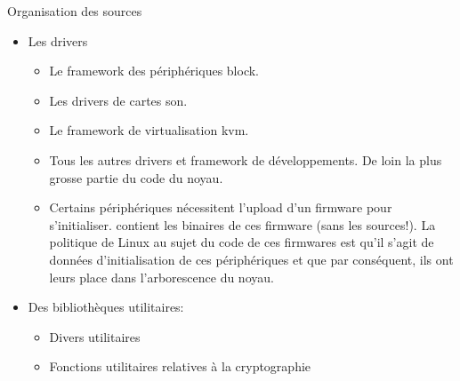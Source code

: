 \begin{frame}[fragile=singleslide]{Organisation des sources}
  \begin{itemize} 
  \item Les drivers
    \begin{itemize} 
    \item {} Le framework des périphériques block.
    \item {} Les drivers de cartes son.
    \item {} Le framework de virtualisation kvm.
    \item  {} Tous  les autres  drivers et  framework de
      développements. De loin la plus grosse partie du code du noyau.
    \item {}  Certains périphériques nécessitent l'upload
      d'un firmware  pour s'initialiser.   contient les
      binaires de  ces firmware (sans  les sources!). La  politique de
      Linux  au sujet du  code de  ces firmwares  est qu'il  s'agit de
      données  d'initialisation  de   ces  périphériques  et  que  par
      conséquent, ils ont leurs place dans l'arborescence du noyau.
    \end{itemize} 
  \item Des bibliothèques utilitaires:
    \begin{itemize} 
    \item {} Divers utilitaires
    \item   {}  Fonctions   utilitaires   relatives  à   la
      cryptographie
    \end{itemize} 
  \end{itemize}
\end{frame}

